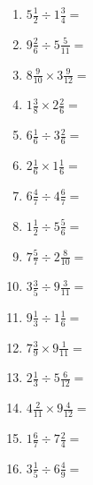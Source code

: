 \documentclass[12pt]{article}
\begin{document}
\begin{enumerate}
\item \large $ 5 \frac{1}{2} \div 1 \frac{3}{4} = $ \vspace{1.6cm}
\item \large $ 9 \frac{2}{6} \div 5 \frac{5}{11} = $ \vspace{1.6cm}
\item \large $ 8 \frac{9}{10} \times 3 \frac{9}{12} = $ \vspace{1.6cm}
\item \large $ 1 \frac{3}{8} \times 2 \frac{2}{6} = $ \vspace{1.6cm}
\item \large $ 6 \frac{1}{6} \div 3 \frac{2}{6} = $ \vspace{1.6cm}
\item \large $ 2 \frac{1}{6} \times 1 \frac{1}{6} = $ \vspace{1.6cm}
\newpage
\item \large $ 6 \frac{4}{7} \div 4 \frac{6}{7} = $ \vspace{1.6cm}
\item \large $ 1 \frac{1}{2} \div 5 \frac{5}{6} = $ \vspace{1.6cm}
\item \large $ 7 \frac{5}{7} \div 2 \frac{8}{10} = $ \vspace{1.6cm}
\item \large $ 3 \frac{3}{5} \div 9 \frac{3}{11} = $ \vspace{1.6cm}
\item \large $ 9 \frac{1}{3} \div 1 \frac{1}{6} = $ \vspace{1.6cm}
\item \large $ 7 \frac{3}{9} \times 9 \frac{1}{11} = $ \vspace{1.6cm}
\item \large $ 2 \frac{1}{3} \div 5 \frac{6}{12} = $ \vspace{1.6cm}
\item \large $ 4 \frac{2}{11} \times 9 \frac{4}{12} = $ \vspace{1.6cm}
\item \large $ 1 \frac{6}{7} \div 7 \frac{2}{4} = $ \vspace{1.6cm}
\item \large $ 3 \frac{1}{5} \div 6 \frac{4}{9} = $ \vspace{1.6cm}
\end{enumerate}
\newpage
\end{document}
